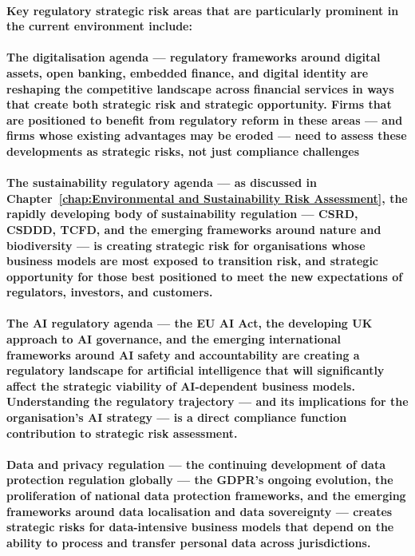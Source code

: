 \paragraph{Key regulatory strategic risk areas that are particularly prominent in the current environment include:}
\paragraph{\textbf{The digitalisation agenda} — regulatory frameworks around digital assets, open banking, embedded finance, and digital identity are reshaping the competitive landscape across financial services in ways that create both strategic risk and strategic opportunity. Firms that are positioned to benefit from regulatory reform in these areas — and firms whose existing advantages may be eroded — need to assess these developments as strategic risks, not just compliance challenges}
\paragraph{\textbf{The sustainability regulatory agenda} — as discussed in Chapter~\ref{chap:Environmental and Sustainability Risk Assessment}, the rapidly developing body of sustainability regulation — CSRD, CSDDD, TCFD, and the emerging frameworks around nature and biodiversity — is creating strategic risk for organisations whose business models are most exposed to transition risk, and strategic opportunity for those best positioned to meet the new expectations of regulators, investors, and customers.}
\paragraph{\textbf{The AI regulatory agenda} — the EU AI Act, the developing UK approach to AI governance, and the emerging international frameworks around AI safety and accountability are creating a regulatory landscape for artificial intelligence that will significantly affect the strategic viability of AI-dependent business models. Understanding the regulatory trajectory — and its implications for the organisation's AI strategy — is a direct compliance function contribution to strategic risk assessment.}
\paragraph{\textbf{Data and privacy regulation} — the continuing development of data protection regulation globally — the GDPR's ongoing evolution, the proliferation of national data protection frameworks, and the emerging frameworks around data localisation and data sovereignty — creates strategic risks for data-intensive business models that depend on the ability to process and transfer personal data across jurisdictions.}
